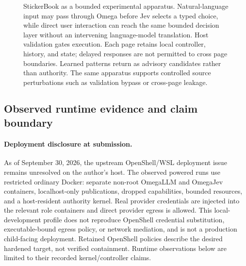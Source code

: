 \documentclass[11pt]{article}
\begin{document}
\begin{figure}[t]
\centering
\resizebox{0.92\textwidth}{!}{}
\caption{StickerBook as a bounded experimental apparatus. Natural-language input may pass through Omega before Jev selects a typed choice, while direct user interaction can reach the same bounded decision layer without an intervening language-model translation. Host validation gates execution. Each page retains local controller, history, and state; delayed responses are not permitted to cross page boundaries. Learned patterns return as advisory candidates rather than authority. The same apparatus supports controlled source perturbations such as validation bypass or cross-page leakage.}
\label{fig:stickerbook-apparatus}
\end{figure}

\subsection{Observed runtime evidence and claim boundary}
\paragraph{Deployment disclosure at submission.}
As of September 30, 2026, the upstream OpenShell/WSL deployment issue remains unresolved on the author's host. The observed powered runs use restricted ordinary Docker: separate non-root OmegaLLM and OmegaJev containers, localhost-only publications, dropped capabilities, bounded resources, and a host-resident authority kernel. Real provider credentials are injected into the relevant role containers and direct provider egress is allowed. This local-development profile does not reproduce OpenShell credential substitution, executable-bound egress policy, or network mediation, and is not a production child-facing deployment. Retained OpenShell policies describe the desired hardened target, not verified containment. Runtime observations below are limited to their recorded kernel/controller claims.
\end{document}
